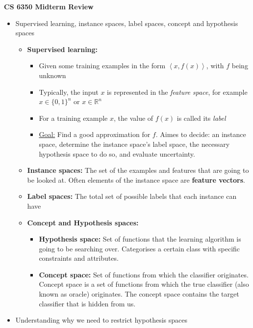 \documentclass{article}
\begin{document}
\begin{center}
{\huge \bf CS 6350 Midterm Review}
\end{center}


\hspace{-1.5em}{\large \bf General Supervised Learning}
\begin{itemize}
\item Supervised learning, instance spaces, label spaces, concept and hypothesis spaces
	\begin{itemize}
	\item {\bf Supervised learning:} 
		\begin{itemize}
		\item Given some training examples in the form $\left< x,f(x)\right>$, with $f$ being unknown
		\item Typically, the input $x$ is represented in the {\em feature space}, for example $x\in \{0,1\}^{n}\text{ or }x\in \mathbb{R}^{n}$
		\item For a training example $x$, the value of $f(x)$ is called its {\em label}
		\item \underline{Goal:} Find a good approximation for $f$. Aimes to decide: an instance space, determine the instance space's label space, the necessary hypothesis space to do so, and evaluate uncertainty.
		\end{itemize}
	\item {\bf Instance spaces:} The set of the examples and features that are going to be looked at. Often elements of the instance space are \textbf{feature vectors}. 
	\item {\bf Label spaces:} The total set of possible labels that each instance can have
	\item {\bf Concept and Hypothesis spaces:}
		\begin{itemize}
		\item {\bf Hypothesis space:} Set of functions that the learning algorithm is going to be searching over. Categorises a certain class with specific constraints and attributes.
		\item {\bf Concept space:} Set of functions from which the classifier originates. Concept space is a set of functions from which the true classifier (also known as oracle) originates. The concept space contains the target classifier that is hidden from us. 
		\end{itemize}
	\end{itemize}
\item Understanding why we need to restrict hypothesis spaces

\end{itemize}
\end{document}
